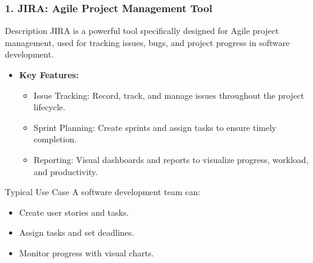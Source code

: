 \documentclass[aspectratio=169]{beamer}
\begin{document}
\begin{frame}[fragile]
    \frametitle{1. JIRA: Agile Project Management Tool}
    \begin{block}{Description}
        JIRA is a powerful tool specifically designed for Agile project management, used for tracking issues, bugs, and project progress in software development.
    \end{block}
    \begin{itemize}
        \item \textbf{Key Features:}
        \begin{itemize}
            \item Issue Tracking: Record, track, and manage issues throughout the project lifecycle.
            \item Sprint Planning: Create sprints and assign tasks to ensure timely completion.
            \item Reporting: Visual dashboards and reports to visualize progress, workload, and productivity.
        \end{itemize}
    \end{itemize}
    \begin{block}{Typical Use Case}
        A software development team can:
        \begin{itemize}
            \item Create user stories and tasks.
            \item Assign tasks and set deadlines.
            \item Monitor progress with visual charts.
        \end{itemize}
    \end{block}
\end{frame}
\end{document}
